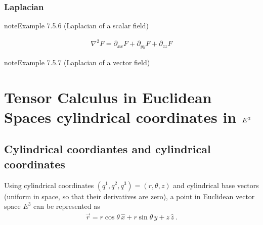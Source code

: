 \documentclass[letterpaper,10pt,english]{jupyterBook}
\begin{document}
\subsubsection{Laplacian}
\label{\detokenize{ch/tensor-algebra-calculus/calculus-euclidean-cartesian:laplacian}}\label{\detokenize{ch/tensor-algebra-calculus/calculus-euclidean-cartesian:tensor-calculus-cartesian-differential-operators-laplacian}}\label{ch/tensor-algebra-calculus/calculus-euclidean-cartesian:example-5}
\begin{sphinxadmonition}{note}{Example 7.5.6 (Laplacian of a scalar field)}


\begin{equation*}
\begin{split}\nabla^2 F = \partial_{xx} F + \partial_{yy} F + \partial_{zz} F\end{split}
\end{equation*}\end{sphinxadmonition}
\label{ch/tensor-algebra-calculus/calculus-euclidean-cartesian:example-6}
\begin{sphinxadmonition}{note}{Example 7.5.7 (Laplacian of a vector field)}


\end{sphinxadmonition}

\sphinxstepscope


\section{Tensor Calculus in Euclidean Spaces \sphinxhyphen{} cylindrical coordinates in \protect\(E^3\protect\)}
\label{\detokenize{ch/tensor-algebra-calculus/calculus-euclidean-cylindrical:tensor-calculus-in-euclidean-spaces-cylindrical-coordinates-in-e-3}}\label{\detokenize{ch/tensor-algebra-calculus/calculus-euclidean-cylindrical:tensor-calculus-cylindrical}}\label{\detokenize{ch/tensor-algebra-calculus/calculus-euclidean-cylindrical::doc}}

\subsection{Cylindrical coordiantes and cylindrical coordinates}
\label{\detokenize{ch/tensor-algebra-calculus/calculus-euclidean-cylindrical:cylindrical-coordiantes-and-cylindrical-coordinates}}\label{\detokenize{ch/tensor-algebra-calculus/calculus-euclidean-cylindrical:tensor-calculus-cylindrical-coordinates}}
\sphinxAtStartPar
Using cylindrical coordinates \((q^1, q^2, q^3) = (r, \theta, z)\) and cylindrical base vectors (uniform in space, so that their derivatives are zero), a point in Euclidean vector space \(E^3\) can be represented as
\begin{equation*}
\begin{split}\vec{r} = r \cos \theta \, \hat{x} + r \sin \theta \, \hat{y} + z \, \hat{z} \ .\end{split}
\end{equation*}
\end{document}
